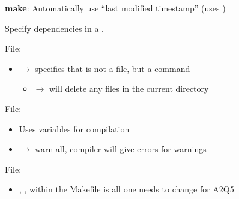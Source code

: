 \textbf{make}: Automatically use ``last modified timestamp'' (uses )

Specify dependencies in a .


File: 
\begin{itemize}
    \item {} $ \rightarrow $ specifies that  is not a file, but
          a command
          \begin{itemize}
              \item {} $ \rightarrow $  will delete any  files
                    in the current directory
          \end{itemize}
\end{itemize}

File: 
\begin{itemize}
    \item Uses variables for compilation
    \item {} $ \rightarrow $ warn all, compiler will give errors for warnings
\end{itemize}

File: 
\begin{itemize}
    \item {}, ,  within
          the Makefile is all one needs to change for A2Q5
\end{itemize}

